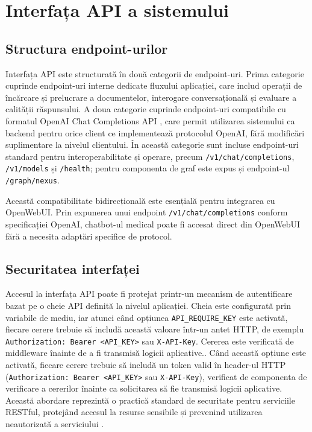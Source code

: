 \documentclass[12pt, a4paper, oneside, romanian]{teza-upb}
\begin{document}
\section{Interfața API a sistemului}

\subsection{Structura endpoint-urilor}

Interfața API este structurată în două categorii de endpoint-uri. Prima categorie cuprinde endpoint-uri interne dedicate fluxului aplicației, care includ operații de încărcare și prelucrare a documentelor, interogare conversațională și evaluare a calității răspunsului. A doua categorie cuprinde endpoint-uri compatibile cu formatul OpenAI Chat Completions API \cite{openai_api}, care permit utilizarea sistemului ca backend pentru orice client ce implementează protocolul OpenAI, fără modificări suplimentare la nivelul clientului. În această categorie sunt incluse endpoint-uri standard pentru interoperabilitate și operare, precum \texttt{/v1/chat/completions}, \texttt{/v1/models} și \texttt{/health}; pentru componenta de graf este expus și endpoint-ul \texttt{/graph/nexus}.

Această compatibilitate bidirecțională este esențială pentru integrarea cu OpenWebUI. Prin expunerea unui endpoint \texttt{/v1/chat/completions} conform specificației OpenAI, chatbot-ul medical poate fi accesat direct din OpenWebUI fără a necesita adaptări specifice de protocol.

\subsection{Securitatea interfaței}

Accesul la interfața API poate fi protejat printr-un mecanism de autentificare bazat pe o cheie API definită la nivelul aplicației. Cheia este configurată prin variabile de mediu, iar atunci când opțiunea \texttt{API\_REQUIRE\_KEY} este activată, fiecare cerere trebuie să includă această valoare într-un antet HTTP, de exemplu \texttt{Authorization: Bearer <API\_KEY>} sau \texttt{X-API-Key}. Cererea este verificată de middleware înainte de a fi transmisă logicii aplicative.. Când această opțiune este activată, fiecare cerere trebuie să includă un token valid în header-ul HTTP (\texttt{Authorization: Bearer <API\_KEY>} sau \texttt{X-API-Key}), verificat de componenta de verificare a cererilor înainte ca solicitarea să fie transmisă logicii aplicative. Această abordare reprezintă o practică standard de securitate pentru serviciile RESTful, protejând accesul la resurse sensibile și prevenind utilizarea neautorizată a serviciului \cite{flask_doc}.
\end{document}
